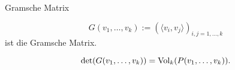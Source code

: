 \documentclass[class=article, crop=false]{standalone}
\begin{document}
\begin{zettel}{Gramsche Matrix}
\begin{flashcard}
    \begin{definition}
\[
    G( v_1,\dots,v_k ):= \left(\langle v_i,v_j\rangle \right)_{i,j = 1,\dots,k}
\] ist die Gramsche Matrix.
    \end{definition}
\end{flashcard}

\begin{theorem}
\[
\det(G ( v_1,\dots,v_k)) = \operatorname{Vol}_k(P(v_1,\dots,v_k))
.\]
\end{theorem}
\end{zettel}
\end{document}
